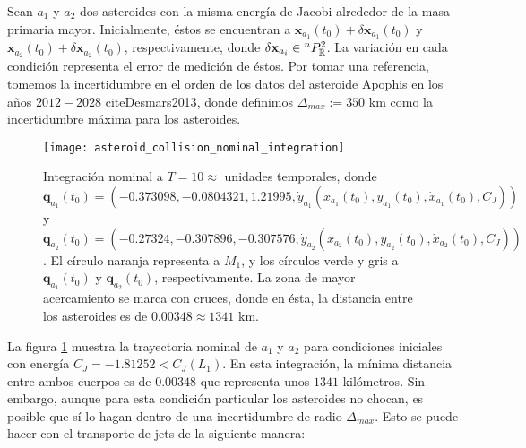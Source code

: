 

Sean $a_1$ y $a_2$ dos asteroides con la misma energía de Jacobi alrededor de la masa primaria mayor. Inicialmente, éstos se encuentran a $\mathbf{x}_{a_1}(t_0) + \delta\mathbf{x}_{a_1}(t_0)$  y $\mathbf{x}_{a_2}(t_0) + \delta\mathbf{x}_{a_2}(t_0)$, respectivamente, donde $\delta\mathbf{x}_{a_i} \in {^{n}P_{\mathbb{R}}^ 2 }$. La variación en cada condición representa el error de medición de éstos. Por tomar una referencia, tomemos la incertidumbre en el orden de los datos del asteroide Apophis en los años $2012 - 2028$ cite{Desmars2013}, donde definimos $\Delta_{max} := 350 $ km como la incertidumbre máxima para los asteroides.

\begin{figure}
 \centering
 \texttt{[image: asteroid\_collision\_nominal\_integration]}
 \caption{Integración nominal a $T=10 \approx $ unidades temporales, donde $\mathbf{q}_{a_1}(t_0) = \left( -0.373098, -0.0804321, 1.21995, \dot{y}_{a_1} \left( x_{a_1}(t_0), y_{a_1}(t_0), \dot{x}_{a_1}(t_0), C_J \right) \right)$ 
 y $\mathbf{q}_{a_2}(t_0) = \left( -0.27324, -0.307896, -0.307576, \dot{y}_{a_2} \left( x_{a_2}(t_0), y_{a_2}(t_0), \dot{x}_{a_2}(t_0), C_J \right) \right)$. El círculo naranja representa a $M_1$, y los círculos verde y gris a $\mathbf{q}_{a_1}(t_0)$ y $\mathbf{q}_{a_2}(t_0)$, respectivamente. La zona de mayor acercamiento se marca con cruces, donde en ésta, la distancia entre los asteroides es de $0.00348 \approx 1341$ km.}
 \label{fig:asteroid_collision_nominal_integration}
\end{figure}

La figura \ref{fig:asteroid_collision_nominal_integration} muestra la trayectoria nominal de $a_1$ y $a_2$ para condiciones iniciales con energía $C_J = -1.81252 < C_J(L_1)$. En esta integración, la mínima distancia entre ambos cuerpos es de $0.00348$ que representa unos $1341$ kilómetros. Sin embargo, aunque para esta condición particular los asteroides no chocan, es posible que sí lo hagan dentro de una incertidumbre de radio $\Delta_{max}$. Esto se puede hacer con el transporte de jets de la siguiente manera: 

